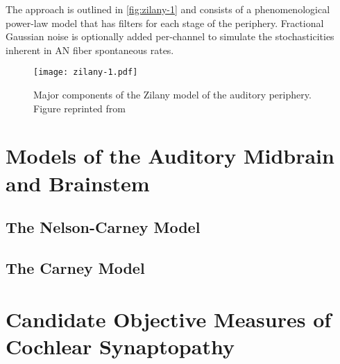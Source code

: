 The approach is outlined in \autoref{fig:zilany-1} and consists of a phenomenological power-law model that has filters for each stage of the periphery.  Fractional Gaussian noise is optionally added per-channel to simulate the stochasticities inherent in AN fiber spontaneous rates. 

\begin{figure}[htbp]
	\centering
	\texttt{[image: zilany-1.pdf]}
	\caption[The Zilany Model]{Major components of the Zilany model of the auditory periphery.  Figure reprinted from \cite{Zilany2009Phenomenological}}
	\label{fig:zilany-1}
\end{figure}
\section{Models of the Auditory Midbrain and Brainstem} %
\label{sec:models_of_the_auditory_midbrain_and_brainstem}
\subsection{The Nelson-Carney Model} %
\label{sub:the_nelson_carney_model}
\cite{Nelson2004Phenomenological}

\subsection{The Carney Model} %
\label{sub:the_carney_model}




\section{Candidate Objective Measures of Cochlear Synaptopathy} %
\label{sec:objective_measures_of_cochlear_synaptopathy}

